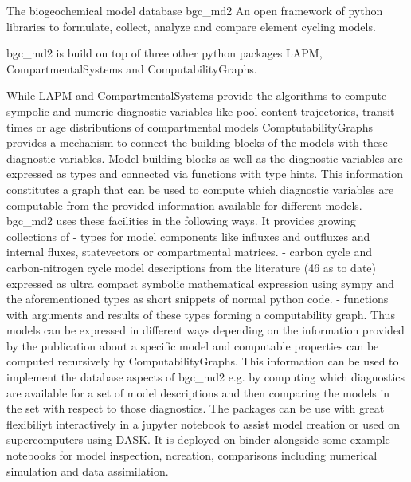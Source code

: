 The biogeochemical model database bgc_md2
An open framework of python libraries to formulate, collect, analyze and compare element cycling models.

bgc_md2 is build on top of three other python packages LAPM, CompartmentalSystems and ComputabilityGraphs.

While LAPM and CompartmentalSystems provide the algorithms to compute sympolic and numeric diagnostic variables like pool content trajectories, transit times or age distributions of compartmental models ComptutabilityGraphs provides a mechanism to connect the building blocks of the models with these diagnostic variables. 
Model building blocks as well as the diagnostic variables are expressed as types and connected via functions with type hints. This information constitutes a graph that can be used to compute which diagnostic variables are computable from the provided information available for different models.
bgc_md2 uses these facilities in the following ways.
It provides growing collections of 
- types for model components like influxes and outfluxes and internal fluxes, statevectors or  compartmental matrices.
- carbon cycle and carbon-nitrogen cycle model descriptions from the literature (46 as to date) expressed as ultra compact symbolic mathematical expression using sympy and the aforementioned types as short snippets of normal python code. 
- functions with arguments and results of these types forming a computability graph.
Thus models can be expressed in different ways depending on the information provided by the publication about a specific model and computable properties can be computed recursively by ComputabilityGraphs.
This information can be used to implement the database aspects of bgc_md2 e.g. by computing which diagnostics are available for a set of model descriptions and then comparing the models in the set with respect to those diagnostics. 
The packages can be use with great flexibiliyt interactively in a jupyter notebook to assist model creation or used on supercomputers using DASK.
It is deployed on binder alongside some example notebooks for model inspection, ncreation, comparisons including numerical simulation and data assimilation. 
